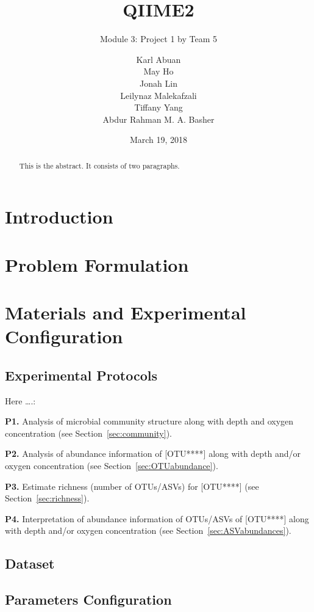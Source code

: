 \documentclass[11 pt,]{article}
\title{QIIME2}
\subtitle{Module 3: Project 1 by Team 5}
\author{Karl Abuan \\ May Ho \\ Jonah Lin \\ Leilynaz Malekafzali \\ Tiffany Yang \\ Abdur Rahman M. A. Basher}
\date{March 19, 2018}
\newcommand*{\secref}[1]{Section~\ref{#1}}
\begin{document}
\maketitle
\begin{abstract}
This is the abstract. It consists of two paragraphs.
\end{abstract}

{
\hypersetup{linkcolor=black}
\setcounter{tocdepth}{3}
\tableofcontents
}
\section{Introduction}\label{introduction}

\section{Problem Formulation}\label{problem-formulation}

\section{Materials and Experimental
Configuration}\label{materials-and-experimental-configuration}

\subsection{Experimental Protocols}\label{experimental-protocols}

Here \ldots{}.:

\textbf{P1.} Analysis of microbial community structure along with depth
and oxygen concentration (see \secref{sec:community}).

\textbf{P2.} Analysis of abundance information of {[}OTU****{]} along
with depth and/or oxygen concentration (see \secref{sec:OTUabundance}).

\textbf{P3.} Estimate richness (number of OTUs/ASVs) for {[}OTU****{]}
(see \secref{sec:richness}).

\textbf{P4.} Interpretation of abundance information of OTUs/ASVs of
{[}OTU****{]} along with depth and/or oxygen concentration (see
\secref{sec:ASVabundances}).

\subsection{Dataset}\label{dataset}

\subsection{Parameters Configuration}\label{parameters-configuration}
\end{document}
